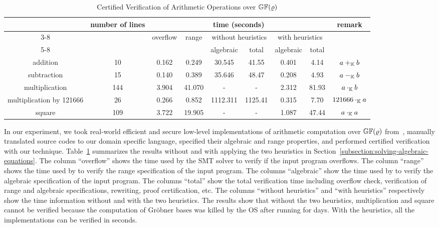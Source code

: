 \begin{table*}
  \caption{Certified Verification of Arithmetic Operations over
    $\mathbb{GF}(\varrho)$}
  \centering
  \begin{tabular}{|c|c|c|c|c|c|c|c|c|}
    \hline
    \multirow{3}{*}{} & \multirow{3}{*}{number of lines} & \multicolumn{6}{|c|}{time (seconds)} & \multirow{3}{*}{remark} \\ \cline{3-8}
    & & \multirow{2}{*}{overflow} & \multirow{2}{*}{range} & \multicolumn{2}{|c|}{without heuristics} & \multicolumn{2}{|c|}{with heuristics} & \\ \cline{5-8}
    & & & & algebraic & total & algebraic & total & \\
    \hline
    addition                 & 10  & 0.162 & 0.249 & 30.545 & 41.55 & 0.401 & 4.14 & $a +_{\mathbb{K}} b$ \\
    \hline
    subtraction              & 15  & 0.140 & 0.389 & 35.646 & 48.47 & 0.208 & 4.93 & $a -_{\mathbb{K}} b$ \\
    \hline
    multiplication           & 144 & 3.904 & 41.070 & - & - & 2.312 & 81.93 & $a \cdot_{\mathbb{K}} b$\\
    \hline
    multiplication by 121666 & 26  & 0.266 & 0.852 & 1112.311 & 1125.41 & 0.315 & 7.70 & $121666 \cdot_{\mathbb{K}} a$\\
    \hline
    square                   & 109 & 3.722 & 19.905  & - & - & 1.087 & 47.44 & $a \cdot_{\mathbb{K}} a$\\
    \hline
  \end{tabular}
  \label{table:arithmetic-operations}
\end{table*}

In our experiment, we took real-world efficient and secure
low-level implementations of arithmetic computation over
$\mathbb{GF}(\varrho)$ from~\cite{BDL+:11:HSHSS,BDL+:12:HSHSS},
manually translated source
codes to our domain specific language, specified their algebraic and range
properties, and performed certified verification with our technique.
Table~\ref{table:arithmetic-operations} summarizes the results
without and with applying the two heuristics in Section~\ref{subsection:solving-algebraic-equations}.
The column ``overflow'' shows the time used by the SMT solver \boolector to verify if the input program overflows.
The column ``range'' shows the time used by \boolector to verify the range specification of the input program.
The columns ``algebraic'' show the time used by \singular to verify the algebraic specification of the input program.
The columns ``total'' show the total verification time including overflow check, verification of range and algebraic specifications, rewriting, proof certification, etc.
The columns ``without heuristics'' and ``with heuristics'' respectively show the time information without and with the two heuristics.
The results show that without the two heuristics, multiplication and square
cannot be verified because the computation of Gr\"obner bases was killed by the OS
after running for days.
With the heuristics, all the implementations can be verified in seconds.

